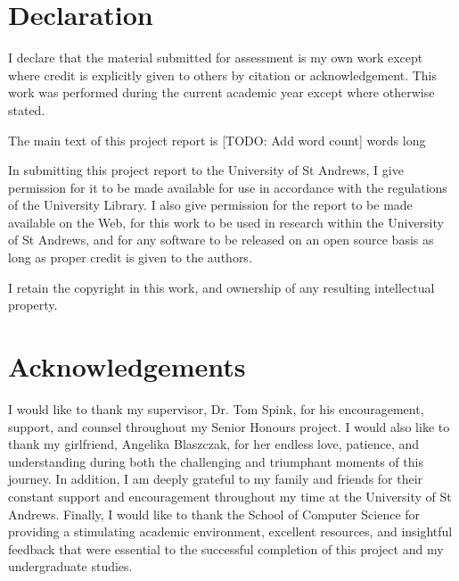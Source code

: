 \chapter*{Declaration}
I declare that the material submitted for assessment is my own work except
where credit is explicitly given to others by citation or acknowledgement. This
work was performed during the current academic year except where otherwise
stated.

The main text of this project report is [TODO: Add word count] words long

In submitting this project report to the University of St Andrews, I give
permission for it to be made available for use in accordance with the
regulations of the University Library. I also give permission for the report to
be made available on the Web, for this work to be used in research within the
University of St Andrews, and for any software to be released on an open source
basis as long as proper credit is given to the authors.


I retain the copyright in this work, and ownership of any resulting intellectual property.

{\let\clearpage\relax \chapter*{Acknowledgements}}
I would like to thank my supervisor, Dr. Tom Spink, for his encouragement, support, and counsel throughout my Senior Honours project. I would also like to thank my girlfriend, Angelika Blaszczak, for her endless love, patience, and understanding during both the challenging and triumphant moments of this journey. In addition, I am deeply grateful to my family and friends for their constant support and encouragement throughout my time at the University of St Andrews. Finally, I would like to thank the School of Computer Science for providing a stimulating academic environment, excellent resources, and insightful feedback that were essential to the successful completion of this project and my undergraduate studies.
